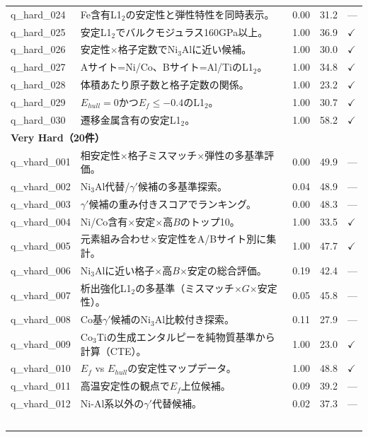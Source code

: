 \documentclass[5p,twocolumn]{elsarticle}
\begin{document}
\begin{longtable}{lp{8.5cm}ccl}
    q\_hard\_024 & Fe含有L1$_2$の安定性と弾性特性を同時表示。 & 0.00 & 31.2 & --- \\
    q\_hard\_025 & 安定L1$_2$でバルクモジュラス160GPa以上。 & 1.00 & 36.9 & $\checkmark$ \\
    q\_hard\_026 & 安定性$\times$格子定数でNi$_3$Alに近い候補。 & 1.00 & 30.0 & $\checkmark$ \\
    q\_hard\_027 & Aサイト=Ni/Co、Bサイト=Al/TiのL1$_2$。 & 1.00 & 34.8 & $\checkmark$ \\
    q\_hard\_028 & 体積あたり原子数と格子定数の関係。 & 1.00 & 23.2 & $\checkmark$ \\
    q\_hard\_029 & $E_{hull} = 0$かつ$E_f \leq -0.4$のL1$_2$。 & 1.00 & 30.7 & $\checkmark$ \\
    q\_hard\_030 & 遷移金属含有の安定L1$_2$。 & 1.00 & 58.2 & $\checkmark$ \\
    \midrule
    \multicolumn{5}{l}{\textbf{Very Hard（20件）}} \\
    \midrule
    q\_vhard\_001 & 相安定性$\times$格子ミスマッチ$\times$弾性の多基準評価。 & 0.00 & 49.9 & --- \\
    q\_vhard\_002 & Ni$_3$Al代替/$\gamma'$候補の多基準探索。 & 0.04 & 48.9 & --- \\
    q\_vhard\_003 & $\gamma'$候補の重み付きスコアでランキング。 & 0.00 & 48.3 & --- \\
    q\_vhard\_004 & Ni/Co含有$\times$安定$\times$高$B$のトップ10。 & 1.00 & 33.5 & $\checkmark$ \\
    q\_vhard\_005 & 元素組み合わせ$\times$安定性をA/Bサイト別に集計。 & 1.00 & 47.7 & $\checkmark$ \\
    q\_vhard\_006 & Ni$_3$Alに近い格子$\times$高$B$$\times$安定の総合評価。 & 0.19 & 42.4 & --- \\
    q\_vhard\_007 & 析出強化L1$_2$の多基準（ミスマッチ$\times$$G$$\times$安定性）。 & 0.05 & 45.8 & --- \\
    q\_vhard\_008 & Co基$\gamma'$候補のNi$_3$Al比較付き探索。 & 0.11 & 27.9 & --- \\
    q\_vhard\_009 & Co$_3$Tiの生成エンタルピーを純物質基準から計算（CTE）。 & 1.00 & 23.0 & $\checkmark$ \\
    q\_vhard\_010 & $E_f$ vs $E_{hull}$の安定性マップデータ。 & 1.00 & 48.8 & $\checkmark$ \\
    q\_vhard\_011 & 高温安定性の観点で$E_f$上位候補。 & 0.09 & 39.2 & --- \\
    q\_vhard\_012 & Ni-Al系以外の$\gamma'$代替候補。 & 0.02 & 37.3 & --- \\
$$
\end{longtable}
\end{document}
